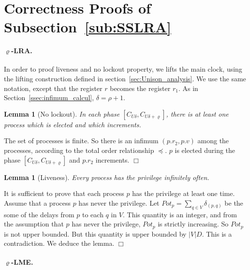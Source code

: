 \documentclass[11pt]{article}
\newenvironment{proof}{{\bf Proof. } }{{\hfill $\Box$}\vspace{.5pc}}
\newtheorem{lemma}[theorem]{Lemma}
\begin{document}
\section{Correctness Proofs of Subsection~\ref{sub:SSLRA}}

\paragraph{$\varrho$-LRA.}

 In order to proof liveness and no lockout property,  we lifts the main clock, using the lifting construction defined in section~\ref{sec:Unison_analysis}.  
We use the same notation, except that the register $r$ becomes the register $r_1$. As in Section~\ref{ssec:infimum_calcul}, $\delta=\rho+1$.

\begin{lemma}[No lockout]
In each phase $\left[ C_{U\delta  },C_{U\delta  +\varrho }\right] $, there is
at least one process which is elected and which increments.
\end{lemma}

\begin{proof}
The set of processes is finite. So there is an infimum $\left( p.r_{2}, p.v\right) $ among the processes, 
according to  the total order relationship $\preceq $.  $p$ is elected during the phase $\left[ C_{U\delta  },C_{U\delta  +\varrho }\right] $ and $p.r_2$  increments.
\end{proof}

\begin{lemma}[Liveness]
\label{lem:liveness}
Every process has the privilege infinitely often.
\end{lemma}

\begin{proof}
It is sufficient to prove that each process $p$ has the privilege at least
one time. Assume that a process $p$ has never the privilege. 
Let $Pot_{p}=\sum\limits_{q\in V}\delta_{( p,q)}$ be the some of the delays from $p$ to
each $q$ in $V$. This quantity is an integer, and from the assumption that $p$ has never the privilege,  $Pot_{p}$ is  strictly increasing.
So $Pot_{p}$ is not upper bounded. But this quantity is upper bounded by
 $\left| V\right| D$. This is a contradiction. We deduce the lemma.
\end{proof}

\paragraph{$\varrho$-LME.}
\end{document}
